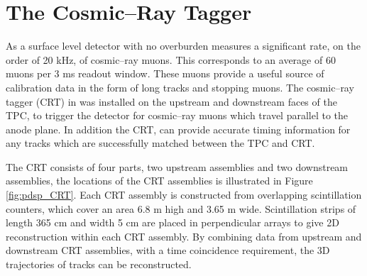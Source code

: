 \section{The Cosmic--Ray Tagger} \label{sec:pdsp_cosmic}

As a surface level detector with no overburden \protodune{} measures a
significant rate, on the order of 20 kHz, of cosmic--ray muons. This corresponds
to an average of 60 muons per 3 ms readout window. These muons provide a 
useful source of calibration data in the form of long tracks and stopping 
muons.  The cosmic--ray tagger (CRT) in \protodune{} was installed on the 
upstream and downstream faces of the TPC, to trigger the detector for 
cosmic--ray muons which travel parallel to the anode plane. In addition the 
CRT, can provide accurate timing information for any tracks which are
successfully matched between the TPC and CRT.

The CRT consists of four parts, two upstream assemblies and two downstream
assemblies, the locations of the CRT assemblies is illustrated in Figure
\ref{fig:pdsp_CRT}. Each CRT assembly is constructed from overlapping 
scintillation counters, which cover an area 6.8 m high and 3.65 m wide. 
Scintillation strips of length 365 cm and width 5 cm are placed in 
perpendicular arrays to give 2D reconstruction within each CRT 
assembly. By combining data from upstream and downstream CRT assemblies, with a 
time coincidence requirement, the 3D trajectories of tracks can be 
reconstructed.

